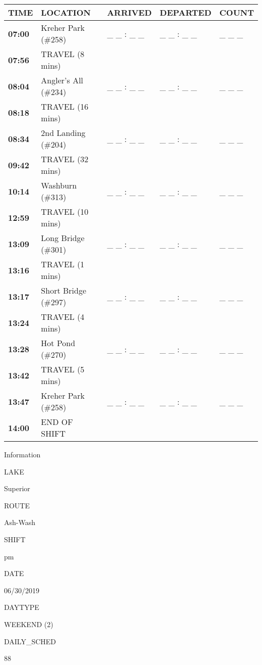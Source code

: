 \documentclass[]{article}
\begin{document}
\begin{tabular}{>{\bfseries}lllll}
\toprule
\textbf{TIME} & \textbf{LOCATION} & \textbf{ARRIVED} & \textbf{DEPARTED} & \textbf{COUNT}\\
\midrule
07:00 & Kreher Park (\#258) & \_ \_ : \_ \_ & \_ \_ : \_ \_ & \_ \_ \_\\
07:56 & TRAVEL (8 mins) &  &  & \\
08:04 & Angler's All (\#234) & \_ \_ : \_ \_ & \_ \_ : \_ \_ & \_ \_ \_\\
08:18 & TRAVEL (16 mins) &  &  & \\
08:34 & 2nd Landing (\#204) & \_ \_ : \_ \_ & \_ \_ : \_ \_ & \_ \_ \_\\
09:42 & TRAVEL (32 mins) &  &  & \\
10:14 & Washburn (\#313) & \_ \_ : \_ \_ & \_ \_ : \_ \_ & \_ \_ \_\\
12:59 & TRAVEL (10 mins) &  &  & \\
13:09 & Long Bridge (\#301) & \_ \_ : \_ \_ & \_ \_ : \_ \_ & \_ \_ \_\\
13:16 & TRAVEL (1 mins) &  &  & \\
13:17 & Short Bridge (\#297) & \_ \_ : \_ \_ & \_ \_ : \_ \_ & \_ \_ \_\\
13:24 & TRAVEL (4 mins) &  &  & \\
13:28 & Hot Pond (\#270) & \_ \_ : \_ \_ & \_ \_ : \_ \_ & \_ \_ \_\\
13:42 & TRAVEL (5 mins) &  &  & \\
13:47 & Kreher Park (\#258) & \_ \_ : \_ \_ & \_ \_ : \_ \_ & \_ \_ \_\\
14:00 & END OF SHIFT &  &  & \\
\bottomrule
\end{tabular}\newpage

Information

LAKE

Superior

ROUTE

Ash-Wash

SHIFT

pm

DATE

06/30/2019

DAYTYPE

WEEKEND (2)

DAILY\_SCHED

88

\vspace{24pt}
\end{document}
